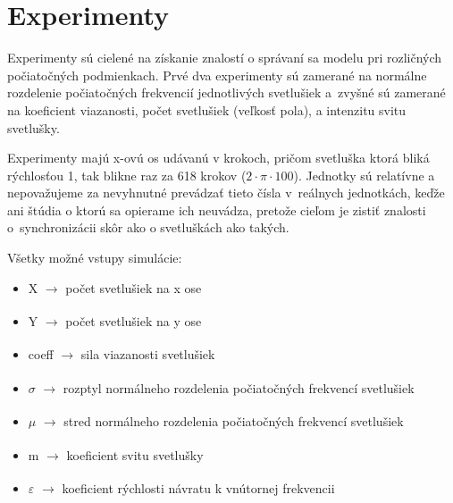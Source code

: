 \documentclass[a4paper, 11pt]{article}
\begin{document}



\pagebreak 
\section{Experimenty}
Experimenty sú cielené na získanie znalostí o správaní sa modelu pri rozličných počiatočných podmienkach. Prvé dva experimenty sú zamerané na normálne rozdelenie počiatočných frekvencií jednotlivých svetlušiek a~zvyšné sú zamerané na koeficient viazanosti, počet svetlušiek (veľkosť pola), a intenzitu svitu svetlušky.

Experimenty majú x-ovú os udávanú v krokoch, pričom svetluška ktorá bliká rýchlosťou 1, tak blikne raz za 618 krokov ($2\cdot\pi\cdot100$). Jednotky sú relatívne a nepovažujeme za nevyhnutné prevádzať tieto čísla v~reálnych jednotkách, keďže ani štúdia o ktorú sa opierame \cite{Svetlusky} ich neuvádza, pretože cieľom je zistiť znalosti o~synchronizácii skôr ako o svetluškách ako takých.

\noindent Všetky možné vstupy simulácie:
\begin{itemize}

    \item X \hspace{1em} $\xrightarrow[]{}$ počet svetlušiek na x ose
    
    \item Y \hspace{1em} $\xrightarrow[]{}$ počet svetlušiek na y ose
    
    \item coeff $\xrightarrow[]{}$ sila viazanosti svetlušiek
    
    \item $\sigma$ \hspace{1.2em} $\xrightarrow[]{}$ rozptyl normálneho rozdelenia počiatočných frekvencí svetlušiek
    
    \item $\mu$ \hspace{1.2em} $\xrightarrow[]{}$    stred normálneho rozdelenia počiatočných frekvencí svetlušiek
    
    \item m  \hspace{1.1em} $\xrightarrow[]{}$ koeficient svitu svetlušky
    
    \item $\varepsilon$ \hspace{1.4em} $\xrightarrow[]{}$ koeficient rýchlosti návratu k vnútornej frekvencii 

\end{itemize}
\end{document}
